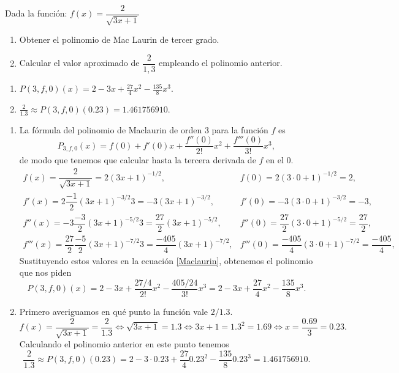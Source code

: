 {Dada la función: $f(x) = \dfrac{2} {{\sqrt {3x+ 1} }}$
\begin{enumerate}
\item Obtener el polinomio de Mac Laurin de tercer grado.
\item Calcular el valor aproximado de $\dfrac{2}{1,3}$ empleando el polinomio anterior.
\end{enumerate}
}
{\begin{enumerate}
\item $P(3,f,0)(x)= 2-3x+\frac{27}{4}x^2-\frac{135}{8}x^3$.
\item $\frac{2}{1.3}\approx P(3,f,0)(0.23)=1.461756910$.
\end{enumerate}
}
{\begin{enumerate}
\item   La fórmula del polinomio de Maclaurin de orden $3$ para la función $f$ es
\begin{equation}
P_{3,f,0} (x)= f(0)+ f'(0)x+\frac{f''(0)}{2!}x^2+\frac{f'''(0)}{3!}x^3,
\label{Maclaurin}
\end{equation}
de modo que tenemos que calcular hasta la tercera derivada de $f$ en el 0.
\[ \renewcommand{\arraystretch}{2}
    \begin{array}{ll}
        f(x)=\dfrac{2}{\sqrt{3x+1}}= 2(3x+1)^{-1/2}, & f(0)=2(3\cdot 0+1)^{-1/2}=2,  \\
        f'(x)=2\dfrac{-1}{2}(3x+1)^{-3/2}3=-3(3x+1)^{-3/2}, &  f'(0)=-3(3\cdot 0+1)^{-3/2}=-3,\\
        f''(x)=-3\dfrac{-3}{2}(3x+1)^{-5/2}3=\dfrac{27}{2}(3x+1)^{-5/2}, &  f''(0)=\dfrac{27}{2}(3\cdot 0+1)^{-5/2}=\dfrac{27}{2},\\
        f'''(x)=\dfrac{27}{2}\dfrac{-5}{2}(3x+1)^{-7/2}3=\dfrac{-405}{4}(3x+1)^{-7/2}, & f'''(0)=\dfrac{-405}{4}(3\cdot 0+1)^{-7/2}=\dfrac{-405}{4},
     \end{array}
\]
Sustituyendo estos valores en la ecuación \ref{Maclaurin}, obtenemos el polinomio que nos piden
\[
P(3,f,0)(x)= 2-3x+\frac{27/4}{2!}x^2-\frac{405/24}{3!}x^3=
2-3x+\frac{27}{4}x^2-\frac{135}{8}x^3.
\]

\item Primero averiguamos en qué punto la función vale $2/1.3$.
\[
f(x)=\frac{2}{\sqrt{3x+1}}=\frac{2}{1.3} \Leftrightarrow \sqrt{3x+1}=1.3 \Leftrightarrow
3x+1=1.3^2=1.69 \Leftrightarrow x=\frac{0.69}{3}=0.23.
\]
Calculando el polinomio anterior en este punto tenemos
\[
\frac{2}{1.3}\approx P(3,f,0)(0.23)= 2-3\cdot 0.23+\frac{27}{4}0.23^2-\frac{135}{8}0.23^3=1.461756910.
\]
\end{enumerate}
}


